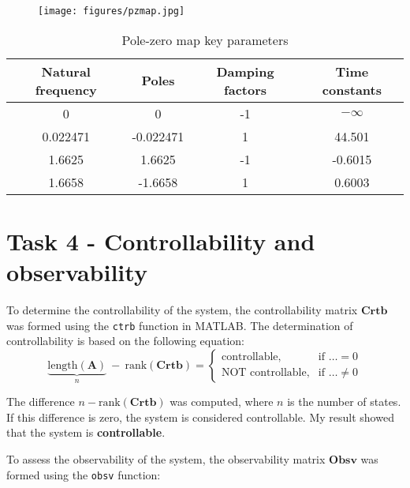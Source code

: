 \documentclass[12pt]{article}
\begin{document}
\begin{figure}[ht!]
  \begin{center}
  \texttt{[image: figures/pzmap.jpg]}
  \label{fig:pzmap00}
  \end{center}
\end{figure}

\begin{table}[htbp]
  \centering
  \caption{Pole-zero map key parameters}
  \label{tab:pzmap}
  \begin{tabular}{cccc}
    \hline
    \textbf{Natural frequency} &\textbf{Poles} & \textbf{Damping factors} & \textbf{Time constants}\\[0.1cm]
    \hline
    0 & 0 & -1 & $-\infty$ \\
    0.022471 & -0.022471 & 1 & 44.501\\
    1.6625 & 1.6625 & -1 & -0.6015\\
    1.6658 & -1.6658 & 1 & 0.6003
  \end{tabular}
\end{table}

\section*{Task 4 - Controllability and observability}
To determine the controllability of the system, the controllability matrix $\mathbf{Crtb}$ was formed using the \texttt{ctrb} function in MATLAB. The determination of controllability is based on the following equation:
\begin{equation}
  \underbrace{\text{length}(\mathbf{A})}_{n}~ - ~ \text{rank}(\mathbf{Crtb})  = \begin{cases}
    \text{controllable}, & \text{if } \dots = 0 \\
    \text{NOT controllable}, & \text{if } \dots \neq 0
  \end{cases}
\end{equation}

\noindent The difference $n - \text{rank}(\mathbf{Crtb})$ was computed, where $n$ is the number of states. If this difference is zero, the system is considered controllable. My result showed that the system is \textbf{controllable}.\\
\medskip

\noindent To assess the observability of the system, the observability matrix $\mathbf{Obsv}$ was formed using the \texttt{obsv} function:
\end{document}
